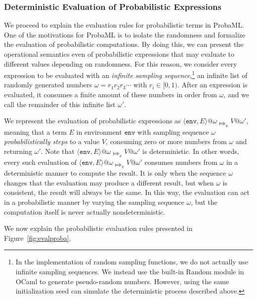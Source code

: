 \documentclass[pageno]{jpaper}
\newcommand{\esteps}{\Mapsto_{\textrm{e}}}
\newcommand{\env}{\mathtt{env}}
\newcommand{\evalenv}[1]{\langle \env, #1 \rangle}
\begin{document}
\subsubsection{Deterministic Evaluation of Probabilistic Expressions} \label{probabilistic_eval_rules}
We proceed to explain the evaluation rules for probabilistic terms in ProbaML. One of the motivations for ProbaML is to isolate the randomness and formalize the evaluation of probabilistic computations. By doing this, we can present the operational semantics even of probabilistic expressions that may evaluate to different values depending on randomness. For this reason, we consider every expression to be evaluated with an \emph{infinite sampling sequence},\footnote{In the implementation of random sampling functions, we do not actually use infinite sampling sequences. We instead use the built-in Random module \cite{ocaml_random} in OCaml to generate pseudo-random numbers. However, using the same initialization seed can simulate the deterministic process described above.} an infinite list of randomly generated numbers $\omega=r_1 r_2 r_3 \cdots$ with $r_i \in [0, 1)$. After an expression is evaluated, it consumes a finite amount of these numbers in order from $\omega$, and we call the remainder of this infinite list $\omega'$.

We represent the evaluation of probabilistic expressions as $\evalenv{E} @ \omega \esteps V @ \omega'$, meaning that a term $E$ in environment $\env$ with sampling sequence $\omega$ \emph{probabilistically steps} to a value $V$, consuming zero or more numbers from $\omega$ and returning $\omega'$. Note that $\evalenv{E} @ \omega \esteps V @ \omega'$ is deterministic. In other words, every such evaluation of $\evalenv{E} @ \omega \esteps V @ \omega'$ consumes numbers from $\omega$ in a deterministic manner to compute the result. It is only when the sequence $\omega$ changes that the evaluation may produce a different result, but when $\omega$ is consistent, the result will always be the same. In this way, the evaluation can act in a probabilistic manner by varying the sampling sequence $\omega$, but the computation itself is never actually nondeterministic.

We now explain the probabilistic evaluation rules presented in Figure~\ref{fig:evalproba}.
\end{document}
